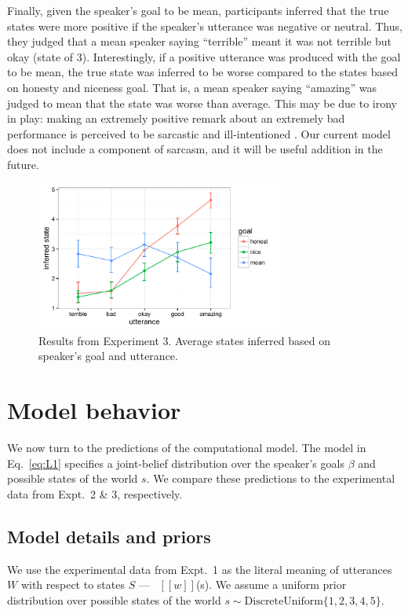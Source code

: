 \documentclass[10pt,letterpaper]{article}
\newcommand{\denote}[1]{\mbox{ $[\![ #1 ]\!]$}}
\begin{document}
Finally, given the speaker's goal to be mean, participants inferred that the true states were more positive if the speaker's utterance was negative or neutral. Thus, they judged that a mean speaker saying ``terrible'' meant it was not terrible but okay (state of 3). Interestingly, if a positive utterance was produced with the goal to be mean, the true state was inferred to be worse compared to the states based on honesty and niceness goal. That is, a mean speaker saying ``amazing'' was judged to mean that the state was worse than average. This may be due to irony in play: making an extremely positive remark about an extremely bad performance is perceived to be sarcastic and ill-intentioned \cite{colston1997}. Our current model does not include a component of sarcasm, and it will be useful addition in the future.

\begin{figure}
\begin{centering} 
\includegraphics[width=3.2in]{figures/exp3.pdf}
\caption{\label{fig:exp3} Results from Experiment 3. Average states inferred based on speaker's goal and utterance.}
\end{centering} 
\end{figure}

\section{Model behavior}

We now turn to the predictions of the computational model.
The model in Eq.~\ref{eq:L1} specifies a joint-belief distribution over the speaker's goals $\beta$ and possible states of the world $s$.
We compare these predictions to the experimental data from Expt.~2 \& 3, respectively.

\subsection{Model details and priors}

We use the experimental data from Expt.~1 as the literal meaning of utterances $W$ with respect to states $S$ --- \denote{w}(s).
We assume a uniform prior distribution over possible states of the world $s\sim \text{DiscreteUniform} \{1, 2, 3, 4, 5\}$. 
\end{document}
